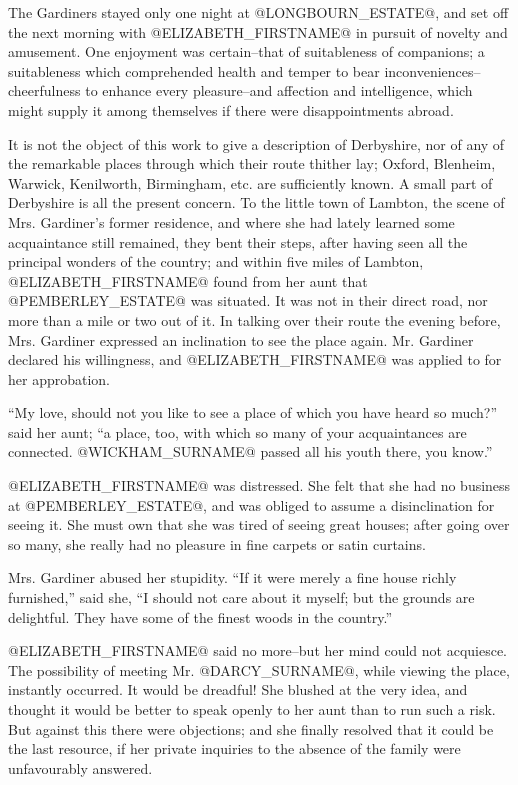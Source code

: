 The Gardiners stayed only one night at @LONGBOURN_ESTATE@, and set off the
next morning with @ELIZABETH_FIRSTNAME@ in pursuit of novelty and amusement.
One enjoyment was certain--that of suitableness of companions;
a suitableness which comprehended health and temper to bear
inconveniences--cheerfulness to enhance every pleasure--and affection
and intelligence, which might supply it among themselves if there were
disappointments abroad.

It is not the object of this work to give a description of Derbyshire,
nor of any of the remarkable places through which their route thither
lay; Oxford, Blenheim, Warwick, Kenilworth, Birmingham, etc. are
sufficiently known. A small part of Derbyshire is all the present
concern. To the little town of Lambton, the scene of Mrs. Gardiner's
former residence, and where she had lately learned some acquaintance
still remained, they bent their steps, after having seen all the
principal wonders of the country; and within five miles of Lambton,
@ELIZABETH_FIRSTNAME@ found from her aunt that @PEMBERLEY_ESTATE@ was situated. It was not
in their direct road, nor more than a mile or two out of it. In
talking over their route the evening before, Mrs. Gardiner expressed
an inclination to see the place again. Mr. Gardiner declared his
willingness, and @ELIZABETH_FIRSTNAME@ was applied to for her approbation.

``My love, should not you like to see a place of which you have heard
so much?'' said her aunt; ``a place, too, with which so many of your
acquaintances are connected. @WICKHAM_SURNAME@ passed all his youth there, you
know.''

@ELIZABETH_FIRSTNAME@ was distressed. She felt that she had no business at
@PEMBERLEY_ESTATE@, and was obliged to assume a disinclination for seeing it. She
must own that she was tired of seeing great houses; after going over so
many, she really had no pleasure in fine carpets or satin curtains.

Mrs. Gardiner abused her stupidity. ``If it were merely a fine house
richly furnished,'' said she, ``I should not care about it myself; but
the grounds are delightful. They have some of the finest woods in the
country.''

@ELIZABETH_FIRSTNAME@ said no more--but her mind could not acquiesce. The
possibility of meeting Mr. @DARCY_SURNAME@, while viewing the place, instantly
occurred. It would be dreadful! She blushed at the very idea, and
thought it would be better to speak openly to her aunt than to run such
a risk. But against this there were objections; and she finally resolved
that it could be the last resource, if her private inquiries to the
absence of the family were unfavourably answered.

